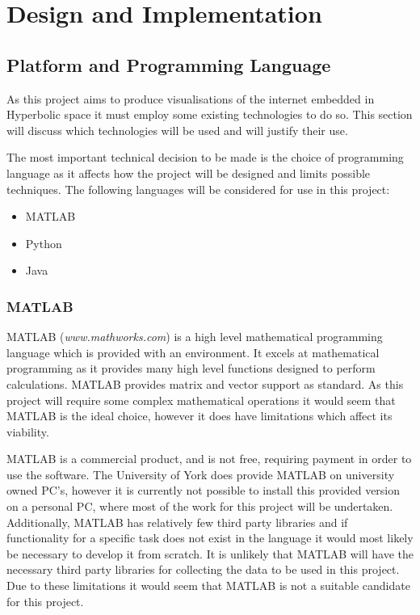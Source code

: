 \chapter{Design and Implementation}
\label{cha:Design}

\section{Platform and Programming Language}
\label{sec:DesignLanguage}
As this project aims to produce visualisations of the internet embedded in Hyperbolic space it must employ some existing technologies to do so. This section will discuss which technologies will be used and will justify their use. 

The most important technical decision to be made is the choice of programming language as it affects how the project will be designed and limits possible techniques. The following languages will be considered for use in this project:

\begin{itemize}
	\item{MATLAB}
	\item{Python}
	\item{Java}
\end{itemize}

\subsection{MATLAB}
MATLAB (\textit{www.mathworks.com}) is a high level mathematical programming language which is provided with an environment. It excels at mathematical programming as it provides many high level functions designed to perform calculations. MATLAB provides matrix and vector support as standard. As this project will require some complex mathematical operations it would seem that MATLAB is the ideal choice, however it does have limitations which affect its viability. 

MATLAB is a commercial product, and is not free, requiring payment in order to use the software. The University of York does provide MATLAB on university owned PC's, however it is currently not possible to install this provided version on a personal PC, where most of the work for this project will be undertaken. Additionally, MATLAB has relatively few third party libraries and if functionality for a specific task does not exist in the language it would most likely be necessary to develop it from scratch.  It is unlikely that MATLAB will have the necessary third party libraries for collecting the data to be used in this project. Due to these limitations it would seem that MATLAB is not a suitable candidate for this project.

